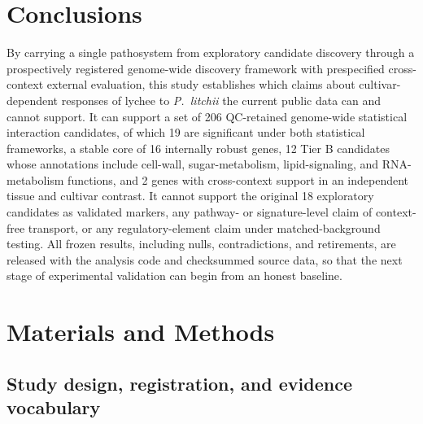 \documentclass[11pt]{article}
\newcommand{\Pl}{\textit{P.~litchii}}
\begin{document}
\section{Conclusions}

By carrying a single pathosystem from exploratory candidate discovery through a prospectively registered genome-wide discovery framework with prespecified cross-context external evaluation, this study establishes which claims about cultivar-dependent responses of lychee to \Pl{} the current public data can and cannot support. It can support a set of 206 QC-retained genome-wide statistical interaction candidates, of which 19 are significant under both statistical frameworks, a stable core of 16 internally robust genes, 12 Tier B candidates whose annotations include cell-wall, sugar-metabolism, lipid-signaling, and RNA-metabolism functions, and 2 genes with cross-context support in an independent tissue and cultivar contrast. It cannot support the original 18 exploratory candidates as validated markers, any pathway- or signature-level claim of context-free transport, or any regulatory-element claim under matched-background testing. All frozen results, including nulls, contradictions, and retirements, are released with the analysis code and checksummed source data, so that the next stage of experimental validation can begin from an honest baseline.

\section{Materials and Methods}

\subsection{Study design, registration, and evidence vocabulary}
\end{document}
